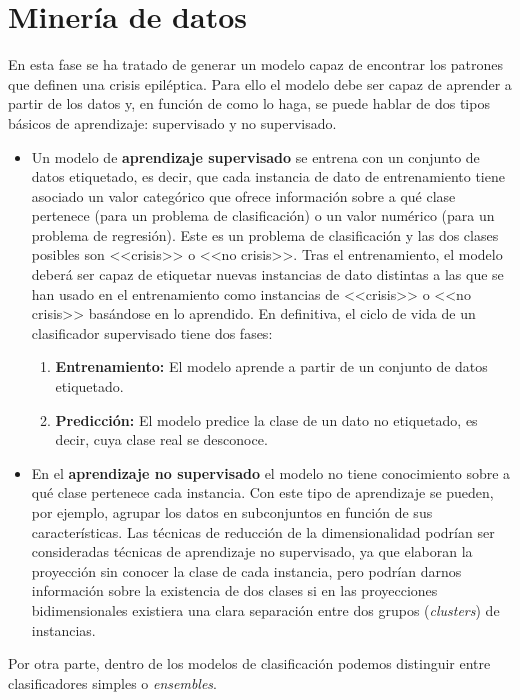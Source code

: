\section{Minería de datos}

En esta fase se ha tratado de generar un modelo capaz de encontrar los patrones que definen una crisis epiléptica. Para ello el modelo debe ser capaz de aprender a partir de los datos y, en función de como lo haga, se puede hablar de dos tipos básicos de aprendizaje: supervisado y no supervisado. 

\begin{itemize}
	\item Un modelo de \textbf{aprendizaje supervisado} se entrena con un conjunto de datos etiquetado, es decir, que cada instancia de dato de entrenamiento tiene asociado un valor categórico que ofrece información sobre a qué clase pertenece (para un problema de clasificación) o un valor numérico (para un problema de regresión). Este es un problema de clasificación y las dos clases posibles son <<crisis>> o <<no crisis>>. Tras el entrenamiento, el modelo deberá ser capaz de etiquetar nuevas instancias de dato distintas a las que se han usado en el entrenamiento como instancias de <<crisis>> o <<no crisis>> basándose en lo aprendido. En definitiva, el ciclo de vida de un clasificador supervisado tiene dos fases: 
	\begin{enumerate}
		\item \textbf{Entrenamiento:} El modelo aprende a partir de un conjunto de datos etiquetado. 
		\item \textbf{Predicción:} El modelo predice la clase de un dato no etiquetado, es decir, cuya clase real se desconoce. 
	\end{enumerate}
	
	\item En el \textbf{aprendizaje no supervisado} el modelo no tiene conocimiento sobre a qué clase pertenece cada instancia. Con este tipo de aprendizaje se pueden, por ejemplo, agrupar los datos en subconjuntos en función de sus características. Las técnicas de reducción de la dimensionalidad podrían ser consideradas técnicas de aprendizaje no supervisado, ya que elaboran la proyección sin conocer la clase de cada instancia, pero podrían darnos información sobre la existencia de dos clases si en las proyecciones bidimensionales existiera una clara separación entre dos grupos (\textit{clusters}) de instancias. 
\end{itemize}

Por otra parte, dentro de los modelos de clasificación podemos distinguir entre clasificadores simples o \textit{ensembles}.

